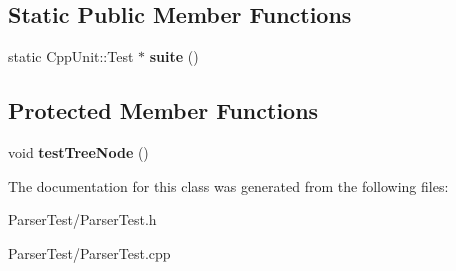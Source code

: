 \subsection*{Static Public Member Functions}
\begin{DoxyCompactItemize}
\item 
static Cpp\+Unit\+::\+Test $\ast$ {\bfseries suite} ()\hypertarget{class_parser_1_1_parser_test_a88132fa6757e8d419275ab7203c35696}{}\label{class_parser_1_1_parser_test_a88132fa6757e8d419275ab7203c35696}

\end{DoxyCompactItemize}
\subsection*{Protected Member Functions}
\begin{DoxyCompactItemize}
\item 
void {\bfseries test\+Tree\+Node} ()\hypertarget{class_parser_1_1_parser_test_aa147dba70e45393c0b18fd3abc10cd3c}{}\label{class_parser_1_1_parser_test_aa147dba70e45393c0b18fd3abc10cd3c}

\end{DoxyCompactItemize}


The documentation for this class was generated from the following files\+:\begin{DoxyCompactItemize}
\item 
Parser\+Test/Parser\+Test.\+h\item 
Parser\+Test/Parser\+Test.\+cpp\end{DoxyCompactItemize}
